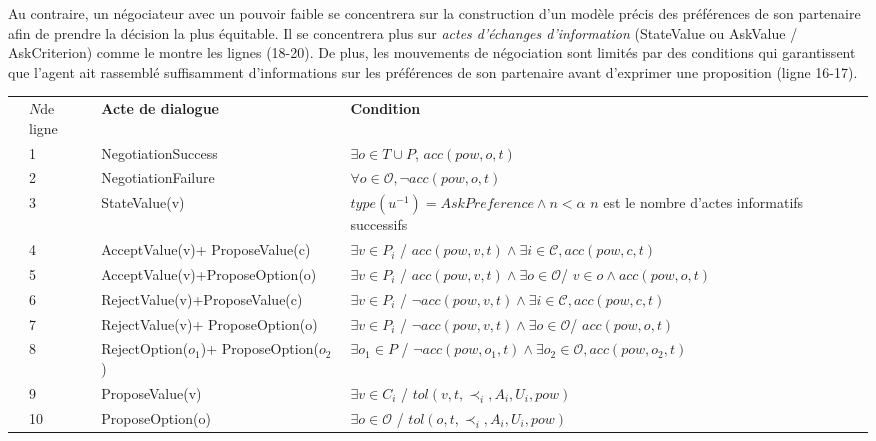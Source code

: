 		Au contraire, un négociateur avec un pouvoir faible se concentrera sur la construction d'un modèle précis des préférences de son partenaire afin de prendre la décision la plus équitable. Il se concentrera plus sur \emph {actes d'échanges d'information} (StateValue ou AskValue / AskCriterion) comme le montre les lignes (18-20). De plus, les mouvements de négociation sont limités par des conditions qui garantissent que l'agent ait rassemblé suffisamment d'informations sur les préférences de son partenaire avant d'exprimer une proposition (ligne 16-17).
	
	\begin{table}[!t]
		
			\centering
			\begin{tabular}{|p{.5cm}|p{.9cm}|p{4cm}|p{7.5cm}|}
				\hline
				\parbox[t]{3mm}{}&$N $de ligne& \textbf{Acte de dialogue} & \textbf{Condition} \\
				&1&NegotiationSuccess & $\exists o \in T\cup P$, $acc(pow,o,t)$ \\
				& 2& NegotiationFailure & $ \forall o \in \mathcal{O},  \neg acc(pow,o,t)$\\
				&3& StateValue(v) & $type(u^{-1}) = AskPreference \land n < \alpha$ \newline $n$ est le nombre d'actes informatifs successifs\\
				&4& AcceptValue(v)+ \newline ProposeValue(c) & $ \exists v \in P_i$ / $acc(pow,v,t) \land \exists i\in\mathcal{C}, acc(pow,c,t)$ \\
				&5& AcceptValue(v)+\newline ProposeOption(o) &  $ \exists v \in P_i$ / $ acc(pow,v,t) \land \exists o \in \mathcal{O}$/ $ v \in o \land acc(pow,o,t)$ \\
				&6& RejectValue(v)+\newline ProposeValue(c) & $ \exists v \in P_i$ / $ \neg acc(pow,v,t) \land \exists i\in\mathcal{C}, acc(pow,c,t)$ \\
				&7& RejectValue(v)+ \newline ProposeOption(o) &  $ \exists v \in P_i$ / $  \neg acc(pow,v,t) \land \exists o \in \mathcal{O}$/ $acc(pow,o,t)$ \\
				& 8&RejectOption($o_1$)+ ProposeOption($o_2$) & $ \exists o_1 \in P$ / $ \neg acc(pow,o_1,t) \land \exists o_2\in\mathcal{O}, acc(pow,o_2,t)$ \\
				&9& ProposeValue(v) & $\exists v \in C_i$ / $tol(v, t, \prec_i, A_i, U_i, pow)$\\
				&10& ProposeOption(o) & $\exists o \in \mathcal{O}$ / $tol(o, t, \prec_i, A_i, U_i, pow)$\\
				

\end{tabular}
\end{table}
